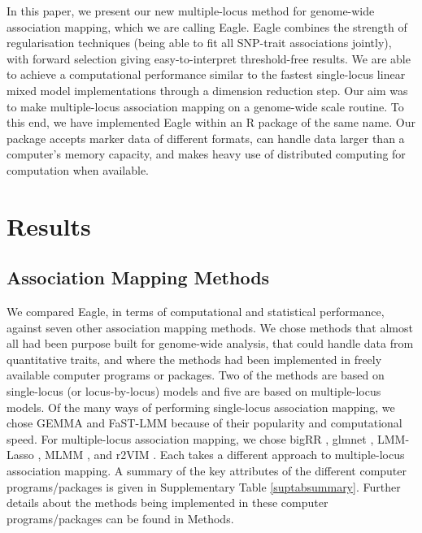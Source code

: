 \documentclass{nature}
\begin{document}
In this paper, we present our new multiple-locus method for genome-wide association mapping, which we are calling Eagle. 
Eagle combines the strength of regularisation techniques (being able to fit all SNP-trait associations jointly), with forward selection giving easy-to-interpret threshold-free results.   We are able to achieve a computational performance similar to the fastest single-locus linear mixed model implementations 
through a dimension reduction step.
Our aim was to make multiple-locus association mapping on a genome-wide scale routine. To this end, we have implemented Eagle 
within an R package of the same name. 
Our package accepts marker data of different 
formats,  can handle data larger than a computer's  memory capacity, and makes heavy use of 
distributed computing for computation when available.  


\section{Results}

\subsection{Association Mapping Methods}

We compared Eagle, in terms of computational and statistical performance, against seven other association mapping methods. 
We chose methods that almost all had been purpose built for genome-wide analysis, that could handle data from quantitative traits, and where the methods had been implemented in freely available computer programs or packages. Two of the methods are based on single-locus (or locus-by-locus) models and five are based on multiple-locus models. Of the many ways of performing single-locus association mapping, we chose 
GEMMA \cite{zhou2012genome}  and FaST-LMM \cite{lippert2011fast} because of their popularity and computational speed. 
For multiple-locus association mapping, we chose bigRR \cite{shen2013novel}, glmnet \cite{Friedman2010glmnet}, 
LMM-Lasso \cite{rakitsch2013lasso}, MLMM \cite{segura2012efficient} , and r2VIM \cite{szymczak2016r2vim}.  
Each takes a different approach to multiple-locus association mapping. A summary of the key attributes of the different computer programs/packages 
is given in Supplementary Table \ref{suptabsummary}. 
Further details about the methods being implemented in these computer programs/packages can be found in Methods.
\end{document}
